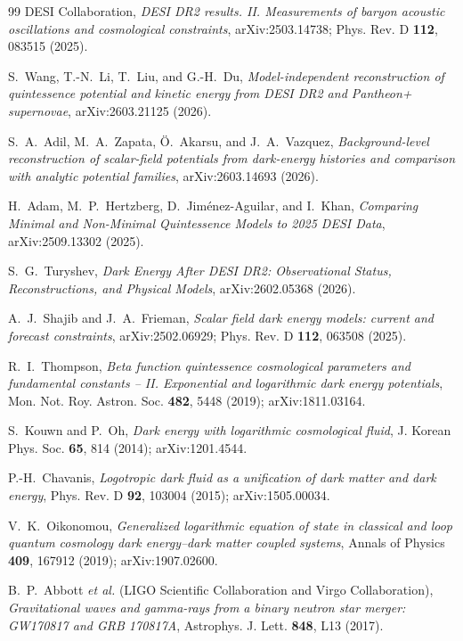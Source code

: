 \documentclass[11pt,reqno]{amsart}
\theoremstyle{plain}
\theoremstyle{definition}
\theoremstyle{remark}
\begin{document}
\begin{thebibliography}{99}
DESI Collaboration,
\emph{DESI DR2 results. II. Measurements of baryon acoustic oscillations and cosmological constraints},
arXiv:2503.14738; Phys. Rev. D \textbf{112}, 083515 (2025).

S.~Wang, T.-N.~Li, T.~Liu, and G.-H.~Du,
\emph{Model-independent reconstruction of quintessence potential and kinetic energy from DESI DR2 and Pantheon+ supernovae},
arXiv:2603.21125 (2026).

S.~A.~Adil, M.~A.~Zapata, \"{O}.~Akarsu, and J.~A.~Vazquez,
\emph{Background-level reconstruction of scalar-field potentials from dark-energy histories and comparison with analytic potential families},
arXiv:2603.14693 (2026).

H.~Adam, M.~P.~Hertzberg, D.~Jim\'enez-Aguilar, and I.~Khan,
\emph{Comparing Minimal and Non-Minimal Quintessence Models to 2025 DESI Data},
arXiv:2509.13302 (2025).

S.~G.~Turyshev,
\emph{Dark Energy After DESI DR2: Observational Status, Reconstructions, and Physical Models},
arXiv:2602.05368 (2026).

A.~J.~Shajib and J.~A.~Frieman,
\emph{Scalar field dark energy models: current and forecast constraints},
arXiv:2502.06929; Phys. Rev. D \textbf{112}, 063508 (2025).

R.~I.~Thompson,
\emph{Beta function quintessence cosmological parameters and fundamental
constants -- II. Exponential and logarithmic dark energy potentials},
Mon. Not. Roy. Astron. Soc. \textbf{482}, 5448 (2019); arXiv:1811.03164.

S.~Kouwn and P.~Oh,
\emph{Dark energy with logarithmic cosmological fluid},
J. Korean Phys. Soc. \textbf{65}, 814 (2014); arXiv:1201.4544.

P.-H.~Chavanis,
\emph{Logotropic dark fluid as a unification of dark matter and dark energy},
Phys. Rev. D \textbf{92}, 103004 (2015); arXiv:1505.00034.

V.~K.~Oikonomou,
\emph{Generalized logarithmic equation of state in classical and loop
quantum cosmology dark energy--dark matter coupled systems},
Annals of Physics \textbf{409}, 167912 (2019); arXiv:1907.02600.

B.~P.~Abbott \emph{et al.} (LIGO Scientific Collaboration and Virgo Collaboration),
\emph{Gravitational waves and gamma-rays from a binary neutron star merger:
GW170817 and GRB 170817A},
Astrophys. J. Lett. \textbf{848}, L13 (2017).


\end{thebibliography}
\end{document}
